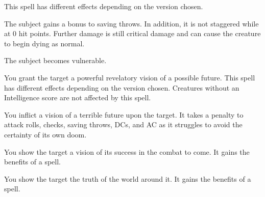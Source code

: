 \spellrng{\rngmed}
\spelldur{\durshort}
\begin{spelleffect}
    This spell has different effects depending on the version chosen.
    \par {} The subject gains a  bonus to saving throws. In addition, it is not staggered while at 0 hit points. Further damage is still critical damage and can cause the creature to begin dying as normal. 
    \par {} The subject becomes vulnerable.
\end{spelleffect}
\begin{spellnotes}
  \vulnerableexplanation
\end{spellnotes}

\spellrng{\rngmed}
\spelldur{\durshort}
\begin{spelleffect}
  You grant the target a powerful revelatory vision of a possible future. This spell has different effects depending on the version chosen. Creatures without an Intelligence score are not affected by this spell.
  \par {} You inflict a vision of a terrible future upon the target. It takes a  penalty to attack rolls, checks, saving throws, DCs, and AC as it struggles to avoid the certainty of its own doom.
  \par {} You show the target a vision of its success in the combat to come. It gains the benefits of a  spell.
  \par {} You show the target the truth of the world around it. It gains the benefits of a  spell.
\end{spelleffect}

